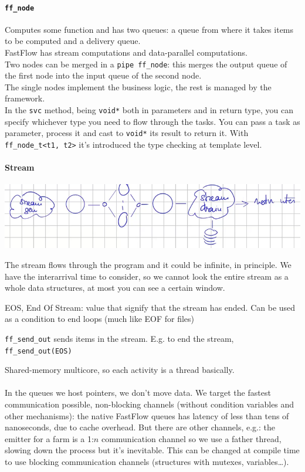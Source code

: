 \documentclass[10pt]{report}
\begin{document}
\paragraph{\texttt{ff\_node}} Computes some function and has two queues: a queue from where it takes items to be computed and a delivery queue.\\
FastFlow has stream computations and data-parallel computations.\\
Two nodes can be merged in a \texttt{pipe ff\_node}: this merges the output queue of the first node into the input queue of the second node.\\
The single nodes implement the business logic, the rest is managed by the framework.\\
In the \texttt{svc} method, being \texttt{void*} both in parameters and in return type, you can specify whichever type you need to flow through the tasks. You can pass a task as parameter, process it and cast to \texttt{void*} its result to return it. With \texttt{ff\_node\_t<t1, t2>} it's introduced the type checking at template level.
\pagebreak
\paragraph{Stream} \begin{center}
	\includegraphics[scale=0.5]{17.png}
\end{center}
The stream flows through the program and it could be infinite, in principle. We have the interarrival time to consider, so we cannot look the entire stream as a whole data structures, at most you can see a certain window.
\begin{list}{}{}
	\item EOS, End Of Stream: value that signify that the stream has ended. Can be used as a condition to end loops (much like EOF for files)
	\item \texttt{ff\_send\_out} sends items in the stream. E.g. to end the stream, \texttt{ff\_send\_out(EOS)}
\end{list}
Shared-memory multicore, so each activity is a thread basically.\\\\
In the queues we host pointers, we don't move data. We target the fastest communication possible, non-blocking channels (without condition variables and other mechanisms): the native FastFlow queues has latency of less than tens of nanoseconds, due to cache overhead. But there are other channels, e.g.: the emitter for a farm is a 1:$n$ communication channel so we use a father thread, slowing down the process but it's inevitable. This can be changed at compile time to use blocking communication channels (structures with mutexes, variables\ldots).
\end{document}

